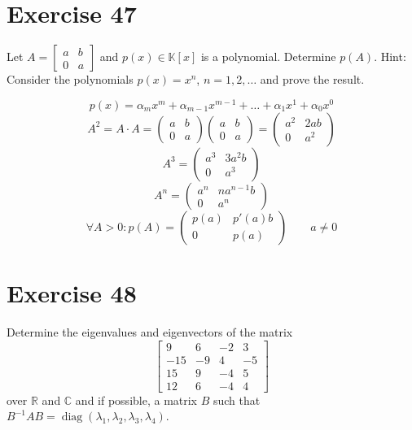 \documentclass[a4paper]{article}
\theoremstyle{definition}
\begin{document}
\section*{Exercise 47}
\begin{ex}
  Let $A = \begin{bmatrix} a & b \\ 0 & a \end{bmatrix}$ and $p(x) \in \mathbb K[x]$ is a polynomial.
  Determine $p(A)$. Hint: Consider the polynomials $p(x) = x^n$, $n = 1, 2, \dots$ and prove the result.
\end{ex}

\[ p(x) = \alpha_m x^m + \alpha_{m-1} x^{m-1} + \dots + \alpha_1 x^1 + \alpha_0 x^0 \]
\[ A^2 = A \cdot A = \begin{pmatrix} a & b \\ 0 & a \end{pmatrix} \begin{pmatrix} a & b \\ 0 & a \end{pmatrix} = \begin{pmatrix} a^2 & 2ab \\ 0 & a^2 \end{pmatrix} \]
\[ A^3 = \begin{pmatrix} a^3 & 3a^2 b \\ 0 & a^3 \end{pmatrix} \]
\[ A^n = \begin{pmatrix} a^n & na^{n-1} b \\ 0 & a^n \end{pmatrix} \]
\[
  \forall A > 0:
  p(A) = \begin{pmatrix}
    p(a) & p'(a) b \\
    0 & p(a)
  \end{pmatrix} \qquad a \neq 0
\]

\section*{Exercise 48}
\begin{ex}
  Determine the eigenvalues and eigenvectors of the matrix
  \[
    \begin{bmatrix}
      9 & 6 & -2 & 3 \\
      -15 & -9 & 4 & -5 \\
      15 & 9 & -4 & 5 \\
      12 & 6 & -4 & 4
    \end{bmatrix}
  \]
  over $\mathbb R$ and $\mathbb C$ and if possible, a matrix $B$ such that $B^{-1} AB = \operatorname{diag}(\lambda_1, \lambda_2, \lambda_3, \lambda_4)$.
\end{ex}
\end{document}
